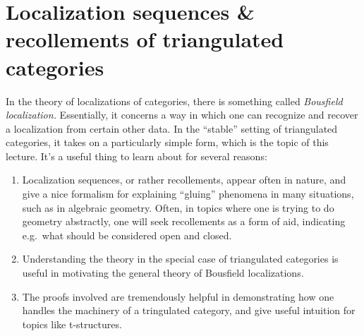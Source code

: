 
\section{Localization sequences \& recollements of triangulated categories}\label{lecture:localization-sequences-of-triangulated-categories}
In the theory of localizations of categories, there is something called \emph{Bousfield localization.} Essentially, it concerns a way in which one can recognize and recover a localization from
certain other data. In the ``stable'' setting of triangulated categories, it takes on a particularly simple form, which is the topic of this lecture. It's a useful thing to learn about
for several reasons:
\begin{enumerate}[label=(\arabic*)]
\item Localization sequences, or rather recollements, appear often in nature, and give a nice formalism for explaining ``gluing'' phenomena in many situations, such as in algebraic geometry.
Often, in topics where one is trying to do geometry abstractly, one will seek recollements as a form of aid, indicating e.g.\ what should be considered open and closed.
\item Understanding the theory in the special case of triangulated categories is useful in motivating the general theory of Bousfield localizations.
\item The proofs involved are tremendously helpful in demonstrating how one handles the machinery of a tringulated category, and give useful intuition for topics like t-structures.
\end{enumerate}

